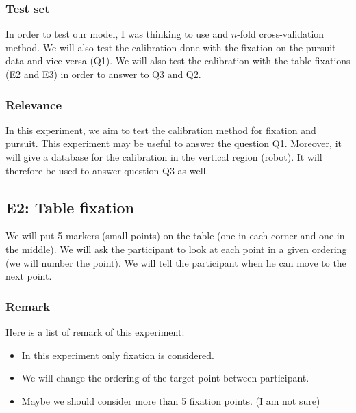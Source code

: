 \documentclass[11pt,a4paper]{article}
\begin{document}
\subsubsection{Test set}
In order to test our model, I was thinking to use and $n$-fold cross-validation method. We will also test the calibration done with the fixation on the pursuit data and vice versa (Q1). We will also test the calibration with the table fixations (E2 and E3) in order to answer to Q3 and Q2.

\subsubsection{Relevance}
In this experiment, we aim to test the calibration method for fixation and pursuit. This experiment may be useful to answer the question Q1. Moreover, it will give a database for the calibration in the vertical region (robot). It will therefore be used to answer question Q3 as well. 

\subsection{E2: Table fixation}
We will put 5 markers (small points) on the table (one in each corner and one in the middle). We will ask the participant to look at each point in a given ordering (we will number the point). We will tell the participant when he can move to the next point.

\subsubsection{Remark}
Here is a list of remark of this experiment:
\begin{itemize}
\item In this experiment only fixation is considered.
\item We will change the ordering of the target point between participant.
\item Maybe we should consider more than 5 fixation points. (I am not sure)
\end{itemize}
\end{document}
